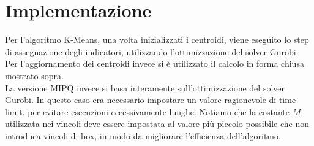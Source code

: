 \documentclass{article}
\begin{document}
    \section{Implementazione}
    Per l'algoritmo K-Means, una volta inizializzati i centroidi, viene eseguito lo step di assegnazione degli indicatori, utilizzando l'ottimizzazione del solver Gurobi. Per l'aggiornamento dei centroidi invece si è utilizzato il calcolo in forma chiusa mostrato sopra.\\
    La versione MIPQ invece si basa interamente sull'ottimizzazione del solver Gurobi. In questo caso era necessario impostare un valore ragionevole di time limit, per evitare esecuzioni eccessivamente lunghe. Notiamo che la costante $M$ utilizzata nei vincoli deve essere impostata al valore più piccolo possibile che non introduca vincoli di box, in modo da migliorare l'efficienza dell'algoritmo.\\
\end{document}
